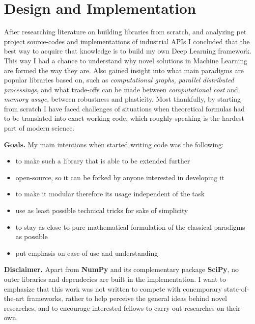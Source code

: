 \chapter{Design and Implementation}

After researching literature on building libraries from scratch, and analyzing pet project source-codes \cite{convnetjs, gibianskysource} and implementations of industrial APIs \cite{TF, caffe, torch}
I concluded that the best way to acquire that knowledge is to build my own Deep Learning framework.
This way I had a chance to understand why novel solutions in Machine Learning are formed the way they are.
Also gained insight into what main paradigms are popular libraries based on, such as \emph{computational graphs, parallel distributed processings}, 
and what trade-offs can be made between \emph{computational cost} and \emph{memory usage}, between robustness and plasticity.
Most thankfully, by starting from scratch I have faced challenges of situations when theoretical formulas had to be translated into exact working code, which roughly speaking is the hardest part of modern science.

\textbf{Goals.} My main intentions when started writing code was the following:
\begin{itemize}
    \item[] to make such a library that is able to be extended further
    \item[] open-source, so it can be forked by anyone interested in developing it
    \item[] to make it modular therefore its usage independent of the task
    \item[] use as least possible technical tricks for sake of simplicity
    \item[] to stay as close to pure mathematical formulation of the classical paradigms as possible
    \item[] put emphasis on ease of use and understanding
\end{itemize}

\textbf{Disclaimer.} Apart from \textbf{NumPy} and its complementary package \textbf{SciPy}, no outer libraries and dependecies are built in the implementation. 
I want to emphasize that this work was not written to compete with conemporary state-of-the-art frameworks, rather to help perceive the general ideas behind novel researches, and to encourage interested fellows to carry out researches on their own.

